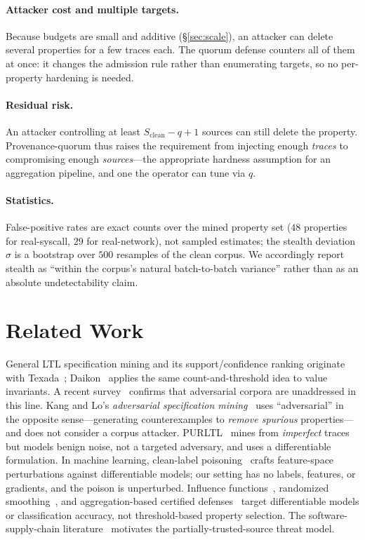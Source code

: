 \documentclass[runningheads]{llncs}
\begin{document}
\paragraph{Attacker cost and multiple targets.} Because budgets are small and
additive (\S\ref{sec:scale}), an attacker can delete several properties for a few
traces each. The quorum defense counters all of them at once: it changes the
admission rule rather than enumerating targets, so no per-property hardening is
needed.
\paragraph{Residual risk.} An attacker controlling at least
$S_{\mathrm{clean}}-q+1$ sources can still delete the property. Provenance-quorum
thus raises the requirement from injecting enough \emph{traces} to compromising
enough \emph{sources}---the appropriate hardness assumption for an aggregation
pipeline, and one the operator can tune via $q$.

\paragraph{Statistics.}
False-positive rates are exact counts over the mined property set ($48$
properties for real-syscall, $29$ for real-network), not sampled estimates; the
stealth deviation $\sigma$ is a bootstrap over $500$ resamples of the clean
corpus. We accordingly report stealth as ``within the corpus's natural
batch-to-batch variance'' rather than as an absolute undetectability claim.

\section{Related Work}\label{sec:rw}
General LTL specification mining and its support/confidence ranking originate with
Texada~\cite{texada}; Daikon~\cite{daikon} applies the same count-and-threshold
idea to value invariants. A recent survey~\cite{ltlsurvey} confirms that
adversarial corpora are unaddressed in this line. Kang and Lo's \emph{adversarial
specification mining}~\cite{adversarialsm} uses ``adversarial'' in the opposite
sense---generating counterexamples to \emph{remove spurious} properties---and does
not consider a corpus attacker. PURLTL~\cite{purltl} mines from \emph{imperfect}
traces but models benign noise, not a targeted adversary, and uses a
differentiable formulation. In machine learning, clean-label
poisoning~\cite{poisonfrogs,metapoison,bullseye} crafts feature-space
perturbations against differentiable models; our setting has no labels, features,
or gradients, and the poison is unperturbed. Influence functions~\cite{koh},
randomized smoothing~\cite{cohen}, and aggregation-based certified
defenses~\cite{baggingcert,certtree} target differentiable models or
classification accuracy, not threshold-based property selection. The
software-supply-chain literature~\cite{supplychain} motivates the
partially-trusted-source threat model.
\end{document}
